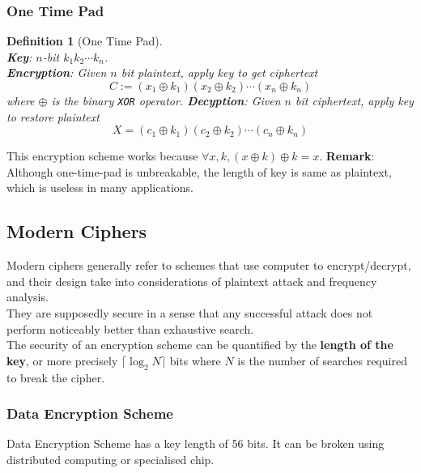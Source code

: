 \documentclass[12pt]{article}
\newtheorem{definition}{Definition}[section]
\theoremstyle{definition}
\begin{document}
\subsubsection{One Time Pad}
\begin{definition}[One Time Pad]
\hfill\\\normalfont
\textbf{Key}: $n$-bit $k_1k_2\cdots k_n$.\\
\textbf{Encryption}: Given $n$ bit plaintext, apply key to get ciphertext
\[
C:=(x_1\oplus k_1)(x_2\oplus k_2)\cdots(x_n\oplus k_n)
\]
where $\oplus$ is the binary \texttt{XOR} operator.
\textbf{Decyption}: Given $n$ bit ciphertext, apply key to restore plaintext
\[
X=(c_1\oplus k_1)(c_2\oplus k_2)\cdots(c_n\oplus k_n)
\]
\end{definition}
This encryption scheme works because $\forall x, k, (x\oplus k)\oplus k = x$.
\textbf{Remark}: Although one-time-pad is unbreakable, the length of key is same as plaintext, which is useless in many applications.
\subsection{Modern Ciphers}
Modern ciphers generally refer to schemes that use computer to encrypt/decrypt, and their design take into considerations of plaintext attack and frequency analysis.\\
They are supposedly secure in a sense that any successful attack does not perform noticeably better than exhaustive search.\\
The security of an encryption scheme can be quantified by the \textbf{length of the key}, or more precisely $\lceil \log_2 N\rceil$ bits where $N$ is the number of searches required to break the cipher.
\subsubsection{Data Encryption Scheme}
Data Encryption Scheme has a key length of 56 bits. It can be broken using distributed computing or specialised chip.
\end{document}
